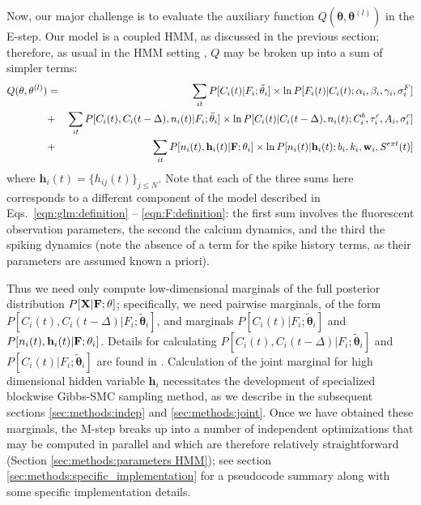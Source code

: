 \documentclass[aoas,preprint]{imsart}
\newcommand{\bth}{\mathbf{\theta}}
\newcommand{\w}{w}
\newcommand{\bw}{\mathbf{\w}}
\newcommand{\bF}{{\bf F}}
\newcommand{\bX}{{\bf X}}
\newcommand{\bh}{\mathbf{h}}
\newcommand{\tbth}{\tilde{\bth}}
\begin{document}
Now, our major challenge is to evaluate the auxiliary function $Q(\bth,\bth^{(l)})$ in the E-step. Our model is a coupled HMM, as discussed in the previous section; therefore, as usual in the HMM setting \cite{RAB89}, $Q$ may be broken up into a sum of simpler terms: 
\begin{eqnarray} 
Q(\bth,\bth^{(l)}) 
&=& \sum_{it} P[C_i(t) | F_i; \tbth_i] \times \ln P[F_i(t)|C_i(t); \alpha_i, \beta_i, \gamma_i, \sigma^F_i] \nonumber \\ 
&+& \sum_{it} P[C_i(t), C_i(t-\Delta), n_i(t) | F_i; \tbth_i] \times \ln P[C_i(t)|C_i(t-\Delta), n_i(t); C^b_i, \tau^c_i, A_i, \sigma^c_i] \nonumber \\ 
&+& \sum_{it} P[n_i(t), \bh_i(t) | \bF; \bth_i] \times \ln P[n_i(t)| \bh_i(t); b_i, k_i, \bw_i, S^{ext}(t)] 
\label{eqn:loglik:definition-expl} 
\end{eqnarray} 
\noindent where $\bh_i(t)=\{h_{ij}(t)\}_{j \leq N}$. Note that each of the three sums here corresponds to a different component of the model described in Eqs.~\eqref{eqn:glm:definition} -- \eqref{eqn:F:definition}: the first sum involves the fluorescent observation parameters, the second the calcium dynamics, and the third the spiking dynamics (note the absence of a term for the spike history terms, as their parameters are assumed known a priori).

Thus we need only compute low-dimensional marginals of the full posterior distribution $P[\bX | \bF; \bth]$; specifically, we need pairwise marginals, of the form $P[C_i(t), C_i(t- \Delta) | F_i; \tbth_i]$, and marginals $P[C_i(t)|F_i;\tbth_i]$ and $P[n_i(t),\bh_i(t)|\bF;\bth_i]$. Details for calculating $P[C_i(t), C_i(t- \Delta) | F_i; \tbth_i]$ and $P[C_i(t)|F_i;\tbth_i]$ are found in \cite{Vogelstein2009}. Calculation of the joint marginal for high dimensional hidden variable $\bh_i$ necessitates the development of specialized blockwise Gibbs-SMC sampling method, as we describe in the subsequent sections \ref{sec:methods:indep} and \ref{sec:methods:joint}. Once we have obtained these marginals, the M-step breaks up into a number of independent optimizations that may be computed in parallel and which are therefore relatively straightforward (Section \ref{sec:methods:parameters HMM}); see section \ref{sec:methods:specific_implementation} for a pseudocode summary along with some specific implementation details.
\end{document}
